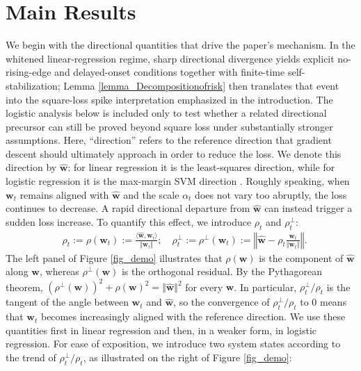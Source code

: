 \documentclass[pdflatex,sn-basic]{sn-jnl}%
\theoremstyle{thmstyleone}%
\begin{document}
\section{Main Results}\label{Main_Results}
We begin with the directional quantities that drive the paper's mechanism. In the whitened linear-regression regime, sharp directional divergence yields explicit no-rising-edge and delayed-onset conditions together with finite-time self-stabilization; Lemma \ref{lemma_Decompositionofrisk} then translates that event into the square-loss spike interpretation emphasized in the introduction. The logistic analysis below is included only to test whether a related directional precursor can still be proved beyond square loss under substantially stronger assumptions. Here, ``direction'' refers to the reference direction that gradient descent should ultimately approach in order to reduce the loss. We denote this direction by $\hat{\mathbf{w}}$: for linear regression it is the least-squares direction, while for logistic regression it is the max-margin SVM direction \citep{implicit_bias_BN,eos_logistic_regression}. Roughly speaking, when $\mathbf{w}_t$ remains aligned with $\hat{\mathbf{w}}$ and the scale $\alpha_t$ does not vary too abruptly, the loss continues to decrease. A rapid directional departure from $\hat{\mathbf{w}}$ can instead trigger a sudden loss increase. To quantify this effect, we introduce $\rho_t$ and $\rho_t^{\perp}$:
\begin{equation*}
\begin{aligned}
  & \rho_t 
  := \rho \left( \mathbf{w}_t \right) 
  := \frac{\langle \hat{\mathbf{w}}, \mathbf{w}_t \rangle}{\Vert \mathbf{w}_t \Vert};
  \quad
  \rho_t^{\perp} 
  := \rho^{\perp} \left( \mathbf{w}_t \right) 
  := \left\Vert
    \hat{\mathbf{w}} - \rho_t \frac{\mathbf{w}_t}{\Vert \mathbf{w}_t \Vert}
  \right\Vert.
\end{aligned} 
\end{equation*}
The left panel of Figure \ref{fig_demo} illustrates that $\rho \left( \mathbf{w} \right)$ is the component of $\hat{\mathbf{w}}$ along $\mathbf{w}$, whereas $\rho^{\perp} \left( \mathbf{w} \right)$ is the orthogonal residual. By the Pythagorean theorem,
$\left(\rho^{\perp} \left( \mathbf{w} \right)\right)^2 + \rho \left( \mathbf{w} \right)^2 = \Vert \hat{\mathbf{w}} \Vert^2$ for every $\mathbf{w}$. In particular, $\rho_t^{\perp} / \rho_t$ is the tangent of the angle between $\mathbf{w}_t$ and $\hat{\mathbf{w}}$, so the convergence of $\rho_t^{\perp} / \rho_t$ to $0$ means that $\mathbf{w}_t$ becomes increasingly aligned with the reference direction. We use these quantities first in linear regression and then, in a weaker form, in logistic regression. For ease of exposition, we introduce two system states according to the trend of $\rho_t^{\perp} / \rho_t$, as illustrated on the right of Figure \ref{fig_demo}:
\end{document}
